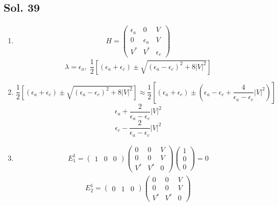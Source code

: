 \subsection*{Sol. 39}
\begin{enumerate}
    \item \begin{align*}
        H = \begin{pmatrix}
            \epsilon_a & 0 & V \\
            0 & \epsilon_a & V \\
            V^* & V^* & \epsilon_c
        \end{pmatrix}
    \end{align*}
    $$
    \lambda = \epsilon_a,\;
    \frac{1}{2}\left[
    (\epsilon_a+\epsilon_c)
    \pm 
    \sqrt{(\epsilon_a-\epsilon_c)^2+8|V|^2}
    \right]
    $$
    \item 
    $$
    \frac{1}{2}\left[
    (\epsilon_a+\epsilon_c)
    \pm 
    \sqrt{(\epsilon_a-\epsilon_c)^2+8|V|^2}
    \right]
    \approx 
    \frac{1}{2}\left[
    (\epsilon_a+\epsilon_c)
    \pm 
    \left(\epsilon_a-\epsilon_c
    +\frac{4}{\epsilon_a-\epsilon_c}|V|^2\right)
    \right]
    $$
    $$
    \epsilon_a + \frac{2}{\epsilon_a-\epsilon_c}|V|^2
    $$
    $$
    \epsilon_c - \frac{2}{\epsilon_a-\epsilon_c}|V|^2
    $$
    \item 
    \begin{align*}
        E^1_1=\begin{pmatrix}
            1&0&0
        \end{pmatrix}
        \begin{pmatrix}
            0 & 0 & V \\
            0 & 0 & V \\
            V^* & V^* & 0
        \end{pmatrix}
        \begin{pmatrix}
            1\\0\\0
        \end{pmatrix} = 0
    \end{align*}
    \begin{align*}
        E^1_2=\begin{pmatrix}
            0&1&0
        \end{pmatrix}
        \begin{pmatrix}
            0 & 0 & V \\
            0 & 0 & V \\
            V^* & V^* & 0

\end{pmatrix}
\end{align*}
\end{enumerate}
